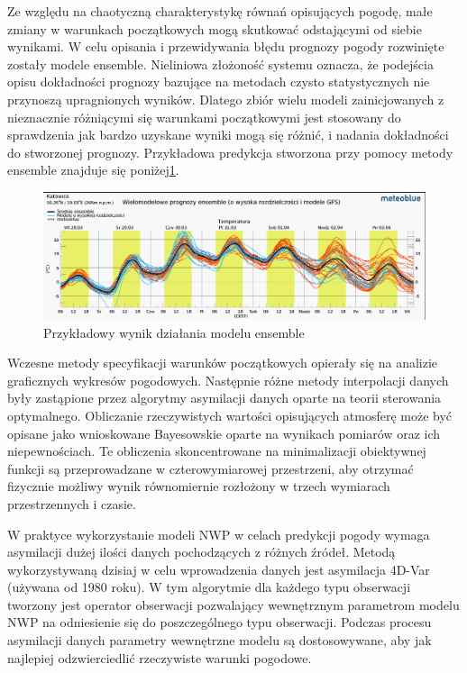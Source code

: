 
Ze względu na chaotyczną charakterystykę równań opisujących pogodę, małe zmiany w warunkach początkowych
mogą skutkować odstającymi od siebie wynikami. W celu opisania i przewidywania błędu prognozy pogody 
rozwinięte zostały modele ensemble. Nieliniowa złożoność systemu oznacza, że podejścia opisu
dokładności prognozy bazujące na metodach czysto statystycznych nie przynoszą upragnionych wyników.
Dlatego zbiór wielu modeli zainicjowanych z nieznacznie różniącymi się warunkami początkowymi
jest stosowany do sprawdzenia jak bardzo uzyskane wyniki mogą się różnić, i nadania dokładności do 
stworzonej prognozy. Przykładowa predykcja stworzona przy pomocy metody ensemble znajduje się 
poniżej\ref{nwp-ensemble}.

\begin{figure}[H]
    \centering
    \includegraphics[width=\textwidth]{images/multimodel.png}
    \caption[ensemble]{Przykładowy wynik działania modelu ensemble\footnotemark}
    \label{nwp-ensemble}
\end{figure}

Wczesne metody specyfikacji warunków początkowych opierały się na analizie graficznych wykresów 
pogodowych. Następnie różne metody interpolacji danych były zastąpione przez algorytmy
asymilacji danych oparte na teorii sterowania optymalnego. Obliczanie rzeczywistych wartości
opisujących atmosferę może być opisane jako wnioskowane Bayesowskie oparte na wynikach pomiarów
oraz ich niepewnościach. Te obliczenia skoncentrowane na minimalizacji obiektywnej funkcji 
są przeprowadzane w czterowymiarowej przestrzeni, aby otrzymać fizycznie możliwy wynik
równomiernie rozłożony w trzech wymiarach przestrzennych i czasie.

W praktyce wykorzystanie modeli NWP w celach predykcji pogody wymaga asymilacji dużej ilości
danych pochodzących z różnych źródeł. Metodą wykorzystywaną dzisiaj w celu wprowadzenia
danych jest asymilacja 4D-Var (używana od 1980 roku). W tym algorytmie dla każdego typu obserwacji tworzony jest
operator obserwacji pozwalający wewnętrznym parametrom modelu NWP na odniesienie się
do poszczególnego typu obserwacji. Podczas procesu asymilacji danych parametry wewnętrzne
modelu są dostosowywane, aby jak najlepiej odzwierciedlić rzeczywiste warunki pogodowe.

